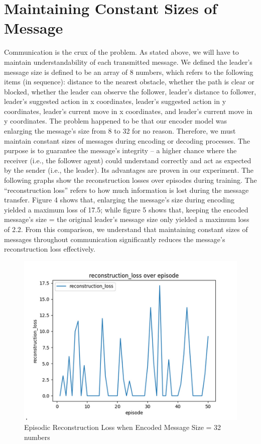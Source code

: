 \documentclass[a4paper,11pt]{article}
\begin{document}
\section{Maintaining Constant Sizes of Message}
Communication is the crux of the problem. As stated above, we will have to maintain understandability of each transmitted message. We defined the leader’s message size is defined to be an array of 8 numbers, which refers to the following items (in sequence): distance to the nearest obstacle, whether the path is clear or blocked, whether the leader can observe the follower, leader's distance to follower, leader's suggested action in x coordinates, leader's suggested action in y coordinates, leader's current move in x coordinates, and leader's current move in y coordinates. The problem happened to be that our encoder model was enlarging the message’s size from 8 to 32 for no reason. Therefore, we must maintain constant sizes of messages during encoding or decoding processes. The purpose is to guarantee the message’s integrity – a higher chance where the receiver (i.e., the follower agent) could understand correctly and act as expected by the sender (i.e., the leader). Its advantages are proven in our experiment. The following graphs show the reconstruction losses over episodes during training. The “reconstruction loss” refers to how much information is lost during the message transfer. Figure 4 shows that, enlarging the message’s size during encoding yielded a maximum loss of 17.5; while figure 5 shows that, keeping the encoded message’s size = the original leader’s message size only yielded a maximum loss of 2.2. From this comparison, we understand that maintaining constant sizes of messages throughout communication significantly reduces the message’s reconstruction loss effectively.

\begin{figure}
    \centering
    \includegraphics[width=0.5\linewidth]{fig4.png}
    \caption{Episodic Reconstruction Loss when Encoded Message Size = 32 numbers}
    \label{fig:enter-label}
\end{figure}
\end{document}
